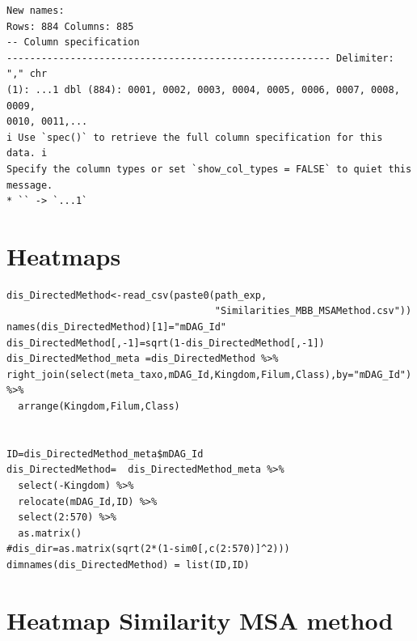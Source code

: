 \documentclass[
  letterpaper,
  DIV=11,
  numbers=noendperiod]{scrreprt}
\newenvironment{Shaded}{\begin{snugshade}}{\end{snugshade}}
\newcommand{\DecValTok}[1]{\textcolor[rgb]{0.68,0.00,0.00}{#1}}
\newcommand{\FunctionTok}[1]{\textcolor[rgb]{0.28,0.35,0.67}{#1}}
\newcommand{\NormalTok}[1]{\textcolor[rgb]{0.00,0.23,0.31}{#1}}
\newcommand{\OtherTok}[1]{\textcolor[rgb]{0.00,0.23,0.31}{#1}}
\newcommand{\SpecialCharTok}[1]{\textcolor[rgb]{0.37,0.37,0.37}{#1}}
\begin{document}
\begin{verbatim}
New names:
Rows: 884 Columns: 885
-- Column specification
-------------------------------------------------------- Delimiter: "," chr
(1): ...1 dbl (884): 0001, 0002, 0003, 0004, 0005, 0006, 0007, 0008, 0009,
0010, 0011,...
i Use `spec()` to retrieve the full column specification for this data. i
Specify the column types or set `show_col_types = FALSE` to quiet this message.
* `` -> `...1`
\end{verbatim}

\begin{Shaded}
\end{Shaded}

\hypertarget{heatmaps}{%
\section{Heatmaps}\label{heatmaps}}

\begin{verbatim}
dis_DirectedMethod<-read_csv(paste0(path_exp,
                                    "Similarities_MBB_MSAMethod.csv"))
names(dis_DirectedMethod)[1]="mDAG_Id"
dis_DirectedMethod[,-1]=sqrt(1-dis_DirectedMethod[,-1])
dis_DirectedMethod_meta =dis_DirectedMethod %>% right_join(select(meta_taxo,mDAG_Id,Kingdom,Filum,Class),by="mDAG_Id") %>%
  arrange(Kingdom,Filum,Class)


ID=dis_DirectedMethod_meta$mDAG_Id
dis_DirectedMethod=  dis_DirectedMethod_meta %>% 
  select(-Kingdom) %>% 
  relocate(mDAG_Id,ID) %>%
  select(2:570) %>%
  as.matrix()
#dis_dir=as.matrix(sqrt(2*(1-sim0[,c(2:570)]^2)))
dimnames(dis_DirectedMethod) = list(ID,ID)
\end{verbatim}

\hypertarget{heatmap-similarity-msa-method}{%
\section{Heatmap Similarity MSA
method}\label{heatmap-similarity-msa-method}}
\end{document}
